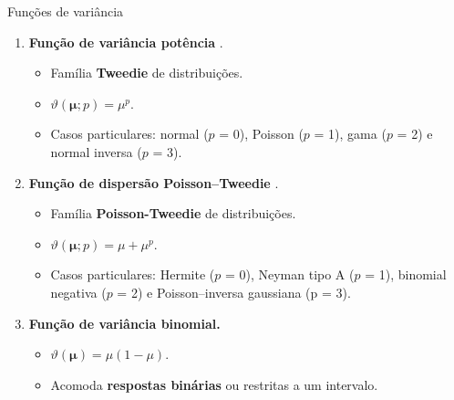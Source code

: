\documentclass[
  ignorenonframetext,
  serif,
  professionalfont,
  usenames,
  dvipsnames,
  aspectratio = 169]{beamer}
\begin{document}
\begin{frame}{Funções de variância}
\protect\hypertarget{funuxe7uxf5es-de-variuxe2ncia}{}
\begin{enumerate}
  \item \textbf{Função de variância potência} \citep{Jorgensen87, Jorgensen97}.
  
    \begin{itemize}
      \item Família \textbf{Tweedie} de distribuições.
      \item $\vartheta\left(\boldsymbol{\mu}; p\right) = \mu^p$.
      \item Casos particulares: normal ($p$ = 0), Poisson ($p$ = 1), gama ($p$ = 2) e normal inversa ($p$ = 3).
    \end{itemize}

  
  \item \textbf{Função de dispersão Poisson–Tweedie} \citep{Jorgensen15}.
  
    \begin{itemize}
      \item Família \textbf{Poisson-Tweedie} de distribuições.
      \item $\vartheta\left(\boldsymbol{\mu}; p\right) = \mu + \mu^p$.
      \item Casos particulares: Hermite ($p$ = 0), Neyman tipo A ($p$ = 1), binomial negativa ($p$ = 2) e Poisson–inversa gaussiana (p = $3$).
      
    \end{itemize}

  \item \textbf{Função de variância binomial.} 
  
    \begin{itemize}
      \item $\vartheta(\boldsymbol{\mu}) = \mu(1 - \mu)$.
      \item Acomoda \textbf{respostas binárias} ou restritas a um intervalo.
    \end{itemize}

\end{enumerate}
\end{frame}
\end{document}
